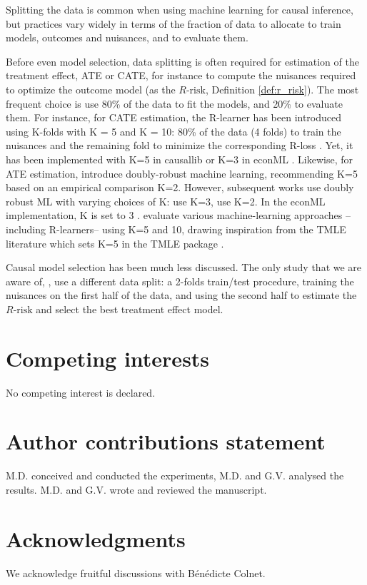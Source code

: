 \documentclass[unnumsec,webpdf,contemporary,large]{oup-authoring-template}%
\theoremstyle{thmstyleone}%
\theoremstyle{thmstyletwo}%
\theoremstyle{thmstylethree}%
\begin{document}
\begin{appendices}
    Splitting the data is common when using machine learning for causal
    inference, but practices vary widely in terms of the fraction of data to
    allocate to train models, outcomes and nuisances, and to evaluate them.

    Before even model selection, data splitting is often required for
    estimation of the treatment effect, ATE or CATE, for instance to compute
    the nuisances required to optimize the outcome model (as the
    $R\text{-risk}$, Definition \ref{def:r_risk}).
    The most frequent choice is use 80\% of the data to fit the models,
    and 20\% to evaluate them.
    For instance, for CATE estimation, the R-learner has been introduced using K-folds with K = 5
    and K = 10: 80\% of the data (4 folds) to train the nuisances and the remaining
    fold to minimize the corresponding R-loss \cite{nie_quasioracle_2017}.
    Yet, it has been implemented with K=5 in causallib
    \cite{causalevaluations} or K=3 in econML \cite{econml}.
    Likewise, for ATE estimation, \cite{chernozhukov_double_2018}
    introduce doubly-robust machine learning,
    recommending K=5 based on an empirical comparison K=2. However,
    subsequent works use doubly robust ML with varying choices
    of K: \cite{loiseau_external_2022} use K=3, \cite{gao_assessment_2021} use
    K=2. In the econML implementation, K is set to 3 \cite{econml}.
    \cite{naimi2021challenges} evaluate various machine-learning approaches
    --including R-learners-- using K=5 and 10, drawing inspiration from the
    TMLE literature which sets
    K=5 in the TMLE package \cite{tmle_package_2012}.

    Causal model selection has been much less discussed. The only study that
    we are aware of, \cite{schuler_comparison_2018}, use a different data
    split: a 2-folds train/test procedure,
    training the nuisances on the first half of the data, and using the
    second half to estimate the $R\text{-risk}$ and select the best treatment
    effect model.

\end{appendices}

\section{Competing interests}
No competing interest is declared.

\section{Author contributions statement}

M.D. conceived and conducted the experiments, M.D. and G.V. analysed the results. M.D. and G.V. wrote and reviewed the manuscript.

\section{Acknowledgments}

We acknowledge fruitful discussions with Bénédicte Colnet.



\end{document}
